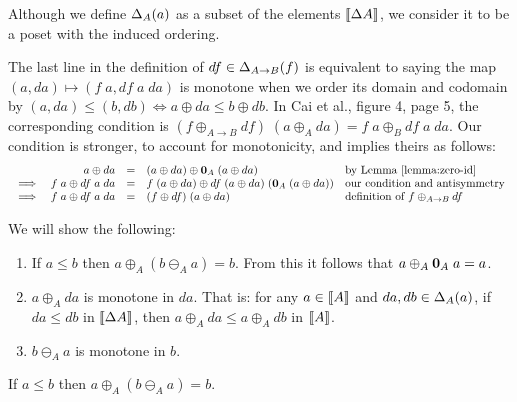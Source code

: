 \documentclass{article}
\begin{document}
Although we define $\Delta_{A}({a})$ as a subset of the elements ${\llbracket{\Delta{A}}\rrbracket}$,
we consider it to be a poset with the induced ordering.

The last line in the definition of $df \in \Delta_{A \to B}({f})$ is equivalent to
saying the map $(a, da) \mapsto (f\;a, df\;a\;da)$ is monotone when we order its
domain and codomain by $(a,da) \le (b,db) \iff a \oplus da \le b \oplus db$.
%
In Cai et al., figure 4, page 5, the corresponding condition is
$(f \oplus_{A \to B} df)\; (a \oplus_A da) = f\;a \oplus_B df\;a\;da$.
%
Our condition is stronger, to account for monotonicity, and implies theirs as follows:
\[\begin{array}{crcll}
  & a \oplus da &=& (a \oplus da) \oplus \mathbf{0}_A \;(a \oplus da)
  & \text{by Lemma \ref{lemma:zero-id}}\\
  \implies& f\;a \oplus df\;a\;da &=&
  f\;(a \oplus da) \oplus df \;(a \oplus da) \;(\mathbf{0}_A \;(a \oplus da))
  & \text{our condition and antisymmetry}\\
  \implies& f\;a \oplus df\;a\;da &=& (f \oplus df) \; (a \oplus da)
  & \text{definition of $f \oplus_{A \to B} df$}
\end{array}\]

We will show the following:

\begin{enumerate}
\item If $a \le b$ then $a \oplus_A (b \ominus_A a) = b$. From this it
  follows that $a \oplus_A \mathbf{0}_A\; a = a$.

\item {} $a \oplus_A da$ is monotone in $da$. That is: for
  any $a \in {\llbracket{A}\rrbracket}$ and $da, db \in \Delta_{A}({a})$, if $da \le db$ in
  ${\llbracket{\Delta{A}}\rrbracket}$, then $a \oplus_A da \le a \oplus_A db$ in ${\llbracket{A}\rrbracket}$.

\item {} $b \ominus_A a$ is monotone in $b$.
\end{enumerate}



\begin{lemma}
  \label{lemma:oplus-ominus}
  \label{lemma:zero-id}
  If $a \le b$ then $a \oplus_A (b \ominus_A a) = b$.
\end{lemma}
\end{document}
